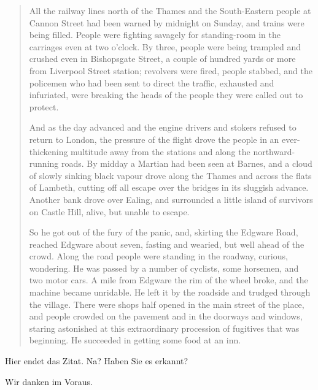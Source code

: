 \documentclass[12pt,ngerman,latin9,a4paper]{g-brief-ntz39}
\begin{document}
\begin{g-brief}
\begin{quote}
All the railway lines north of the Thames and the South-Eastern people at Cannon Street had been warned by midnight on Sunday, and trains were being filled.  People were fighting savagely for standing-room in the carriages even at two o'clock.  By three, people were being trampled and crushed even in Bishopsgate Street, a couple of hundred yards or more from Liverpool Street station; revolvers were fired, people stabbed, and the policemen who had been sent to direct the traffic, exhausted and infuriated, were breaking the heads of the people they were called out to protect.

And as the day advanced and the engine drivers and stokers refused to return to London, the pressure of the flight drove the people in an ever-thickening multitude away from the stations and along the northward-running roads.  By midday a Martian had been seen at Barnes, and a cloud of slowly sinking black vapour drove along the Thames and across the flats of Lambeth, cutting off all escape over the bridges in its sluggish advance.  Another bank drove over Ealing, and surrounded a little island of survivors on Castle Hill, alive, but unable to escape.

So he got out of the fury of the panic, and, skirting the Edgware Road, reached Edgware about seven, fasting and wearied, but well ahead of the crowd.  Along the road people were standing in the roadway, curious, wondering.  He was passed by a number of cyclists, some horsemen, and two motor cars.  A mile from Edgware the rim of the wheel broke, and the machine became unridable.  He left it by the roadside and trudged through the village.  There were shops half opened in the main street of the place, and people crowded on the pavement and in the doorways and windows, staring astonished at this extraordinary procession of fugitives that was beginning.  He succeeded in getting some food at an inn.
\end{quote}

Hier endet das Zitat. Na? Haben Sie es erkannt?

Wir danken im Voraus.

\end{g-brief}
\end{document}

